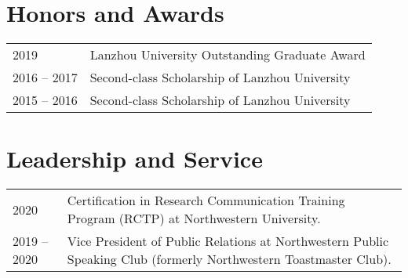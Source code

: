 \documentclass[margin,line,pifont,palatino,courier]{res}
\begin{document}
\begin{resume}
%		

		\section{\sc Honors and Awards}
		\vspace*{.02in}
		\begin{tabular}{@{}p{0.8in}p{4in}}
			2019 & Lanzhou University Outstanding Graduate Award \\
			2016 -- 2017 & Second-class Scholarship of Lanzhou University \\
			2015 -- 2016 & Second-class Scholarship of Lanzhou University \\
		\end{tabular}
		

		\section{\sc Leadership and Service}
		\vspace*{.02in}
		\begin{tabular}{@{}p{0.8in}p{4in}}
			2020 & Certification in Research Communication Training Program (RCTP) at Northwestern University. \vspace*{.1in} \\
			2019 -- 2020 & Vice President of Public Relations at Northwestern Public Speaking Club (formerly Northwestern Toastmaster Club).
		\end{tabular}
		


\end{resume}
\end{document}
